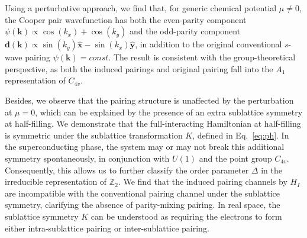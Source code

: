 \documentclass[11pt]{article}
\begin{document}
Using a perturbative approach, we find that,
for generic chemical potential $\mu \neq 0$, the Cooper pair wavefunction has both the even-parity
component $\psi(\bm k) \propto \cos(k_x) + \cos(k_y)$ and the odd-parity component
$\bm d(\bm k) \propto \sin(k_y) \hat{\bm x} - \sin(k_x) \hat{\bm y}$, in addition to the original
conventional $s$-wave pairing $\psi(\bm k) = const$. The result
is consistent with the group-theoretical perspective, as both the
induced pairings and original pairing fall into the $A_1$ representation of $C_{4v}$.

Besides, we observe that the pairing structure is unaffected by the perturbation at $\mu = 0$,
which can be explained by the presence of an extra sublattice symmetry at half-filling.
We demonstrate that the full-interacting Hamiltonian at half-filling is symmetric under
the sublattice transformation $K$, defined in
Eq.~\eqref{eq:ph}. In the superconducting phase, the system may or may not break this
additional symmetry spontaneously, in conjunction with $U(1)$ and the point group $C_{4v}$.
Consequently, this allows us to
further classify the order parameter $\Delta$ in the irreducible representation of $\mathbb{Z}_2$.
We find that the induced pairing channels by $H_I$ are incompatible with the conventional
pairing channel under the sublattice symmetry, clarifying the absence of parity-mixing pairing.
In real space, the sublattice symmetry $K$ can be understood as requiring the electrons to
form either intra-sublattice pairing or inter-sublattice pairing.

\end{document}
